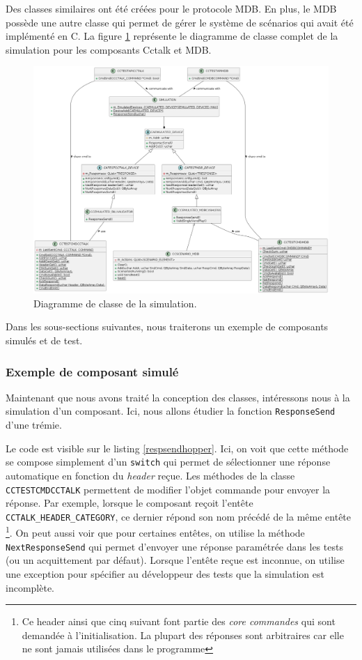 \documentclass[a4paper]{article}
\begin{document}
Des classes similaires ont été créées pour le protocole MDB. En plus, le MDB
possède une autre classe qui permet de gérer le système de scénarios qui avait
été implémenté en C. La figure \ref{fig:simcomplete} représente le diagramme de
classe complet de la simulation pour les composants Cctalk et MDB.

\pagebreak
\begin{figure}[h!]
  \begin{center}
  \includegraphics[scale=0.3]{./graphs/simulation.png}
    \caption{Diagramme de classe de la simulation.}
    \label{fig:simcomplete}
  \end{center}
\end{figure}

Dans les sous-sections suivantes, nous traiterons un exemple de composants
simulés et de test.

\subsubsection{Exemple de composant simulé}

Maintenant que nous avons traité la conception des classes, intéressons nous à
la simulation d'un composant. Ici, nous allons étudier la fonction
\verb|ResponseSend| d'une trémie.

Le code est visible sur le listing \ref{respsendhopper}. Ici, on voit que
cette méthode se compose simplement d'un \verb|switch| qui permet de
sélectionner une réponse automatique en fonction du \textit{header} reçue. Les
méthodes de la classe \verb|CCTESTCMDCCTALK| permettent de modifier l'objet
commande pour envoyer la réponse. Par exemple, lorsque le composant reçoit
l'entête \verb|CCTALK_HEADER_CATEGORY|, ce dernier répond son nom précédé de la
même entête \footnote{Ce header ainsi que cinq suivant font partie des
\textit{core commandes} qui sont demandée à l'initialisation. La plupart des
réponses sont arbitraires car elle ne sont jamais utilisées dans le programme}.
On peut aussi voir que pour certaines entêtes, on utilise la méthode
\verb|NextResponseSend| qui permet d'envoyer une réponse paramétrée dans les
tests (ou un acquittement par défaut). Lorsque l'entête reçue est inconnue, on
utilise une exception pour spécifier au développeur des tests que la simulation
est incomplète.
\end{document}
